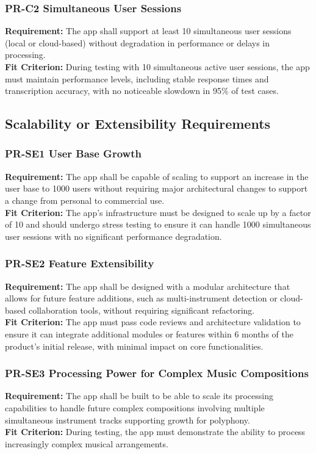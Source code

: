 \documentclass[12pt]{article}
\begin{document}
\subsubsection*{PR-C2 Simultaneous User Sessions} \label{PR-C2}
\textbf{Requirement:} The app shall support at least 10 simultaneous user sessions (local or cloud-based) without degradation in performance or delays in processing.\\
\textbf{Fit Criterion:} During testing with 10 simultaneous active user sessions, the app must maintain performance levels, including stable response times and transcription accuracy, with no noticeable slowdown in 95\% of test cases.

\subsection{Scalability or Extensibility Requirements}
\subsubsection*{PR-SE1 User Base Growth} \label{PR-SE1}
\textbf{Requirement:} The app shall be capable of scaling to support an increase in the user base to 1000 users without requiring major architectural changes to support a change from personal to commercial use.\\
\textbf{Fit Criterion:} The app’s infrastructure must be designed to scale up by a factor of 10 and should undergo stress testing to ensure it can handle 1000 simultaneous user sessions with no significant performance degradation.
\subsubsection*{PR-SE2 Feature Extensibility} \label{PR-SE2}
\textbf{Requirement:} The app shall be designed with a modular architecture that allows for future feature additions, such as multi-instrument detection or cloud-based collaboration tools, without requiring significant refactoring.\\
\textbf{Fit Criterion:} The app must pass code reviews and architecture validation to ensure it can integrate additional modules or features within 6 months of the product’s initial release, with minimal impact on core functionalities.
\subsubsection*{PR-SE3 Processing Power for Complex Music Compositions} \label{PR-SE3}
\textbf{Requirement:} The app shall be built to be able to scale its processing capabilities to handle future complex compositions involving multiple simultaneous instrument tracks supporting growth for polyphony.\\
\textbf{Fit Criterion:} During testing, the app must demonstrate the ability to process increasingly complex musical arrangements.
\end{document}
